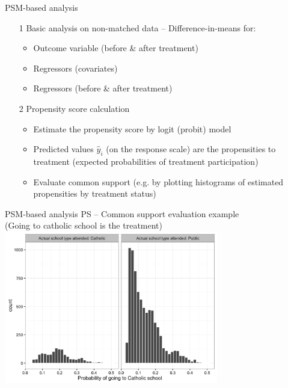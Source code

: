 \documentclass{beamer}
\begin{document}
\begin{frame}{PSM-based analysis}
\begin{enumerate}
    \item[1] Basic analysis on non-matched data -- Difference-in-means for:\\ \medskip
    \begin{itemize}
        \item Outcome variable (before \& after treatment)
        \item Regressors (covariates)
        \item Regressors (before \& after treatment)
    \end{itemize}
    \bigskip
    \item[2] Propensity score calculation\\ \medskip
    \begin{itemize}
        \item Estimate the propensity score by logit (probit) model
        \item Predicted values $\hat{y}_i$ (on the response scale) are the propensities to treatment (expected probabilities of treatment participation)
        \item Evaluate common support (e.g. by plotting histograms of estimated propensities by treatment status)     
    \end{itemize}
\end{enumerate}
\end{frame}
\begin{frame}{PSM-based analysis}
    \centering
    PS -- Common support evaluation example \\(Going to catholic school is the treatment)\\
\includegraphics[trim = 0cm 0cm 0cm 0cm, clip, width=0.7\textwidth]{./IMG/PSM_comm_supp.png}    
\end{frame}
\end{document}
